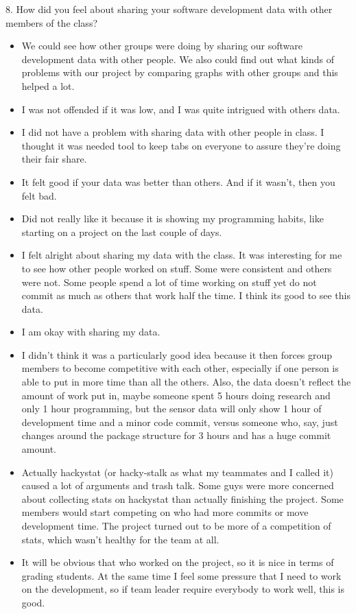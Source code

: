 \documentclass[11pt]{article}
\begin{document}
8. How did you feel about sharing your software development 
data with other members of the class? 
\begin{itemize}
\item We could see how other groups were doing by sharing our software development data with other people. We also could find out what kinds of problems with our project by comparing graphs with other groups and this helped a lot. 
\item I was not offended if it was low, and I was quite intrigued with others data.  
\item I did not have a problem with sharing data with other people in class.  I thought it was needed tool to keep tabs on everyone to assure they're doing their fair share.
\item It felt good if your data was better than others.  And if it wasn't, then you felt bad.
\item Did not really like it because it is showing my programming habits, like starting on a project on the last couple of days.
\item I felt alright about sharing my data with the class. It was interesting for me to see how other people worked on stuff. Some were consistent and others were not. Some people spend a lot of time working on stuff yet do not commit as much as others that work half the time. I think its good to see this data.
\item I am okay with sharing my data.  
\item I didn't think it was a particularly good idea because it then forces group members to become competitive with each other, especially if one person is able to put in more time than all the others. Also, the data doesn't reflect the amount of work put in, maybe someone spent 5 hours doing research and only 1 hour programming, but the sensor data will only show 1 hour of development time and a minor code commit, versus someone who, say, just changes around the package structure for 3 hours and has a huge commit amount.
\item Actually hackystat (or hacky-stalk as what my teammates and I called it) caused a lot of arguments and trash talk.  Some guys were more concerned about collecting stats on hackystat than actually finishing the project.  Some members would start competing on who had more commits or move development time.  The project turned out to be more of a competition of stats, which wasn't healthy for the team at all.
\item It will be obvious that who worked on the project, so it is nice in terms of grading students. At the same time I feel some pressure that I need to work on the development, so if team leader require everybody to work well, this is good.

\end{itemize}
\end{document}

